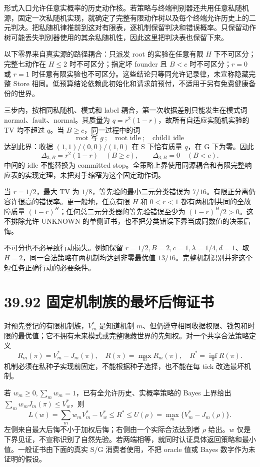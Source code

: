 \documentclass[
  11pt,
  oneside]{book}
\begin{document}
形式入口允许任意实概率的历史动作核。若策略与终端判别器还共用任意私随机源，固定一次私随机实现，就确定了完整有限动作树以及每个终端允许历史上的二元判决。把私随机律推前到这对有限表，逐机制保留判决和错误概率。只保留动作树可能丢失判别器使用的其余私随机性，因此这里把判决表也保留下来。

以下零界来自真实源的路径耦合：只派发 root 的实验在任意有限 \(H\) 下不可区分；完整七动作在 \(H\le2\) 时不可区分；指定坏 founder 且 \(B<c\) 时不可区分；\(r=0\) 或 \(r=1\) 时任意有限实验也不可区分。这些结论只等同允许记录律，未宣称隐藏完整 Store 相同。低预算结论依赖此初始化和请求前预付，不适用于另有免费健康备份的世界。

三步内，按相同私随机、模式和 label 耦合，第一次收据差别只能发生在模式词 normal、fault、normal。其质量为 \(q=r^2(1-r)\)，故所有自适应实随机实验的 TV 均不超过 \(q\)。当 \(B\ge c\)，同一过程中的词 \[\text{root 写 }g\ ;\quad\text{root idle}\ ;\quad\text{child1 idle}\] 达到此界：收据 \((1,1)/(0,0)/(1,0)\) 在 S 下恰有质量 \(q\)，在 G 下为零。因此 \[\Delta_{3,B}=r^2(1-r)\quad(B\ge c),\qquad\Delta_{3,B}=0\quad(B<c).\] 中间的 idle 不能替换为 committed stop。全策略上界使用同源耦合和有限完整响应表的实现定理，未把对手缩窄为这个固定动作词。

当 \(r=1/2\)，最大 TV 为 \(1/8\)，等先验的最小二元分类错误为 \(7/16\)。有限正分离仍容许很高的错误率。更一般地，任意有限 \(H\) 和 \(0<r<1\) 都有两机制共同的全故障质量 \((1-r)^H\)；任何总二元分类器的等先验错误至少为 \((1-r)^H/2>0\)。这不排除允许 UNKNOWN 的单侧证书，也不把分类错误下界当成同数值的决策后悔。

不可分也不必导致行动损失。例如保留 \(r=1/2,B=2,c=1,\lambda=1/4,d=1\)、取 \(H=2\)，同一合法策略在两机制均达到非零最优值 \(13/16\)。完整机制识别并非这个短任务正确行动的必要条件。

\section{39.92 固定机制族的最坏后悔证书}\label{ux56faux5b9aux673aux5236ux65cfux7684ux6700ux574fux540eux6094ux8bc1ux4e66}

对预先登记的有限机制族，\(V_m^*\) 是知道机制 \(m\)、但仍遵守相同收据权限、钱包和时限的最优值；它不拥有未来模式或完整隐藏世界的先知权。对一个共享合法策略定义 \[R_m(\pi)=V_m^*-J_m(\pi),\quad R(\pi)=\max_mR_m(\pi),\quad R^*=\inf_\pi R(\pi).\] 机制必须在私种子实现前固定，不能根据种子选择，也不能在每 tick 改选最坏机制。

若 \(w_m\ge0,\sum_mw_m=1\)，已有全允许历史、实概率策略的 Bayes 上界给出 \(\sum_mw_mJ_m(\pi)\le V_w^*\)，则 \[L(w)=\sum_m w_m V_m^*-V_w^*\le R^*\le U(\rho)=\max_m\{V_m^*-J_m(\rho)\}.\] 左侧来自最大后悔不小于加权后悔；右侧由一个实际合法达到者 \(\rho\) 给出。\(w\) 仅是下界见证，不宣称识别了自然先验。若两端相等，就同时认证具体返回策略和最小值。一般证书由下面的真实 S/G 消费者使用，不把 oracle 值或 Bayes 数字作为未证明的假设。
\end{document}
